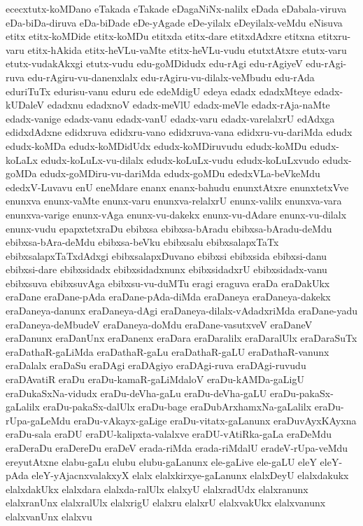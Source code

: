 {ececxtutx-koMDano
eTakada
eTakade
eDagaNiNx-nalilx
eDada
eDabala-viruva
eDa-biDa-diruva
eDa-biDade
eDe-yAgade
eDe-yilalx
eDeyilalx-veMdu
eNisuva
etitx
etitx-koMDide
etitx-koMDu
etitxda
etitx-dare
etitxdAdxre
etitxna
etitxru-varu
etitx-hAkida
etitx-heVLu-vaMte
etitx-heVLu-vudu
etutxtAtxre
etutx-varu
etutx-vudakAkxgi
etutx-vudu
edu-goMDidudx
edu-rAgi
edu-rAgiyeV
edu-rAgi-ruva
edu-rAgiru-vu-danenxlalx
edu-rAgiru-vu-dilalx-veMbudu
edu-rAda
eduriTuTx
edurisu-vanu
eduru
ede
edeMdigU
edeya
edadx
edadxMteye
edadx-kUDaleV
edadxnu
edadxnoV
edadx-meVlU
edadx-meVle
edadx-rAja-naMte
edadx-vanige
edadx-vanu
edadx-vanU
edadx-varu
edadx-varelalxrU
edAdxga
edidxdAdxne
edidxruva
edidxru-vano
edidxruva-vana
edidxru-vu-dariMda
edudx
edudx-koMDa
edudx-koMDidUdx
edudx-koMDiruvudu
edudx-koMDu
edudx-koLaLx
edudx-koLuLx-vu-dilalx
edudx-koLuLx-vudu
edudx-koLuLxvudo
edudx-goMDa
edudx-goMDiru-vu-dariMda
edudx-goMDu
ededxVLa-beVkeMdu
ededxV-Luvavu
enU
eneMdare
enanx
enanx-bahudu
enunxtAtxre
enunxtetxVve
enunxva
enunx-vaMte
enunx-varu
enunxva-relalxrU
enunx-valilx
enunxva-vara
enunxva-varige
enunx-vAga
enunx-vu-dakekx
enunx-vu-dAdare
enunx-vu-dilalx
enunx-vudu
epapxtetxraDu
ebibxsa
ebibxsa-bAradu
ebibxsa-bAradu-deMdu
ebibxsa-bAra-deMdu
ebibxsa-beVku
ebibxsalu
ebibxsalapxTaTx
ebibxsalapxTaTxdAdxgi
ebibxsalapxDuvano
ebibxsi
ebibxsida
ebibxsi-danu
ebibxsi-dare
ebibxsidadx
ebibxsidadxnunx
ebibxsidadxrU
ebibxsidadx-vanu
ebibxsuva
ebibxsuvAga
ebibxsu-vu-duMTu
eragi
eraguva
eraDa
eraDakUkx
eraDane
eraDane-pAda
eraDane-pAda-diMda
eraDaneya
eraDaneya-dakekx
eraDaneya-danunx
eraDaneya-dAgi
eraDaneya-dilalx-vAdadxriMda
eraDane-yadu
eraDaneya-deMbudeV
eraDaneya-doMdu
eraDane-vasutxveV
eraDaneV
eraDanunx
eraDanUnx
eraDanenx
eraDara
eraDaralilx
eraDaralUlx
eraDaraSuTx
eraDathaR-gaLiMda
eraDathaR-gaLu
eraDathaR-gaLU
eraDathaR-vanunx
eraDalalx
eraDaSu
eraDAgi
eraDAgiyo
eraDAgi-ruva
eraDAgi-ruvudu
eraDAvatiR
eraDu
eraDu-kamaR-gaLiMdaloV
eraDu-kAMDa-gaLigU
eraDukaSxNa-vidudx
eraDu-deVha-gaLu
eraDu-deVha-gaLU
eraDu-pakaSx-gaLalilx
eraDu-pakaSx-dalUlx
eraDu-bage
eraDubArxhamxNa-gaLalilx
eraDu-rUpa-gaLeMdu
eraDu-vAkayx-gaLige
eraDu-vitatx-gaLanunx
eraDuvAyxKAyxna
eraDu-sala
eraDU
eraDU-kalipxta-valalxve
eraDU-vAtiRka-gaLa
eraDeMdu
eraDeraDu
eraDereDu
eraDeV
erada-riMda
erada-riMdalU
eradeV-rUpa-veMdu
ereyutAtxne
elabu-gaLu
elubu
elubu-gaLanunx
ele-gaLive
ele-gaLU
eleY
eleY-pAda
eleY-yAjacnxvalakxyX
elalx
elalxkirxye-gaLanunx
elalxDeyU
elalxdakukx
elalxdakUkx
elalxdara
elalxda-ralUlx
elalxyU
elalxradUdx
elalxranunx
elalxranUnx
elalxralUlx
elalxrigU
elalxru
elalxrU
elalxvakUkx
elalxvanunx
elalxvanUnx
elalxvu
}
